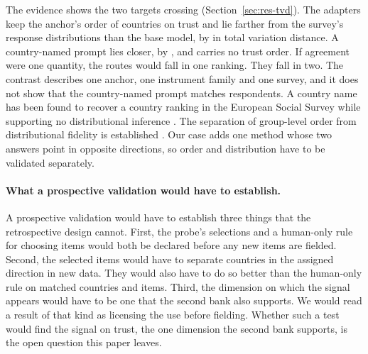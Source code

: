 The evidence shows the two targets crossing (Section~\ref{sec:res-tvd}). The adapters keep the anchor's order of countries on trust and lie farther from the survey's response distributions than the base model, by   in total variation distance. A country-named prompt lies closer, by  , and carries no trust order. If agreement were one quantity, the routes would fall in one ranking. They fall in two. The contrast describes one anchor, one instrument family and one survey, and it does not show that the country-named prompt matches respondents. A country name has been found to recover a country ranking in the European Social Survey while supporting no distributional inference \citep{wangc2026}. The separation of group-level order from distributional fidelity is established \citep{dasilva2026}. Our case adds one method whose two answers point in opposite directions, so order and distribution have to be validated separately.

\paragraph{What a prospective validation would have to establish.} A prospective validation would have to establish three things that the retrospective design cannot. First, the probe's selections and a human-only rule for choosing items would both be declared before any new items are fielded. Second, the selected items would have to separate countries in the assigned direction in new data. They would also have to do so better than the human-only rule on matched countries and items. Third, the dimension on which the signal appears would have to be one that the second bank also supports. We would read a result of that kind as licensing the use before fielding. Whether such a test would find the signal on trust, the one dimension the second bank supports, is the open question this paper leaves.

